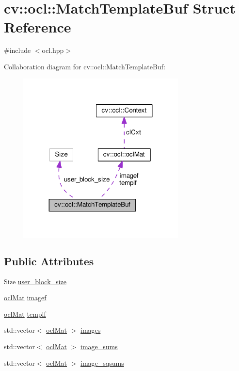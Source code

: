 \hypertarget{structcv_1_1ocl_1_1MatchTemplateBuf}{\section{cv\-:\-:ocl\-:\-:Match\-Template\-Buf Struct Reference}
\label{structcv_1_1ocl_1_1MatchTemplateBuf}
}


{\ttfamily \#include $<$ocl.\-hpp$>$}



Collaboration diagram for cv\-:\-:ocl\-:\-:Match\-Template\-Buf\-:\nopagebreak
\begin{figure}[H]
\begin{center}
\leavevmode
\includegraphics[width=239pt]{structcv_1_1ocl_1_1MatchTemplateBuf__coll__graph}
\end{center}
\end{figure}
\subsection*{Public Attributes}
\begin{DoxyCompactItemize}
\item 
Size \hyperlink{structcv_1_1ocl_1_1MatchTemplateBuf_a17e43450248311a5e8c575a8717c3bfc}{user\-\_\-block\-\_\-size}
\item 
\hyperlink{classcv_1_1ocl_1_1oclMat}{ocl\-Mat} \hyperlink{structcv_1_1ocl_1_1MatchTemplateBuf_a4646b074f758c75de0d7b09d00847e52}{imagef}
\item 
\hyperlink{classcv_1_1ocl_1_1oclMat}{ocl\-Mat} \hyperlink{structcv_1_1ocl_1_1MatchTemplateBuf_a3e749d91ad8812ab00f687e35b0b7466}{templf}
\item 
std\-::vector$<$ \hyperlink{classcv_1_1ocl_1_1oclMat}{ocl\-Mat} $>$ \hyperlink{structcv_1_1ocl_1_1MatchTemplateBuf_afd5853ee21092ac4887cf98e13af666d}{images}
\item 
std\-::vector$<$ \hyperlink{classcv_1_1ocl_1_1oclMat}{ocl\-Mat} $>$ \hyperlink{structcv_1_1ocl_1_1MatchTemplateBuf_abcdb92fb2c021b9336d87e65cd40f30c}{image\-\_\-sums}
\item 
std\-::vector$<$ \hyperlink{classcv_1_1ocl_1_1oclMat}{ocl\-Mat} $>$ \hyperlink{structcv_1_1ocl_1_1MatchTemplateBuf_ae57f603ce6493fc33311a697d3c6a9ad}{image\-\_\-sqsums}
\end{DoxyCompactItemize}


